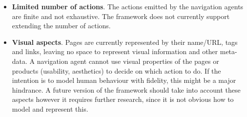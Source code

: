 \begin{itemize}
    \item \textbf{Limited number of actions}. The actions emitted by the 
    navigation agents are finite and not exhaustive. The framework does not 
    currently support extending the number of actions. %
    
    \item \textbf{Visual aspects}. Pages are currently represented by their 
    name/URL, tags and links, leaving no space to represent visual information 
    and other meta-data. A navigation agent cannot use visual properties of the 
    pages or products (usability, aesthetics) to decide on which action to do. 
    If the intention is to model human behaviour with fidelity, this might be a 
    major hindrance. A future version of the framework should take into account 
    these aspects however it requires further research, since it is not obvious 
    how to model and represent this.
    
\end{itemize}
